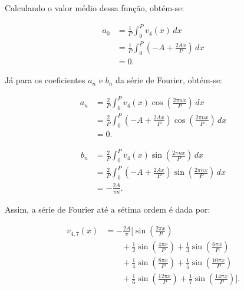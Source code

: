 Calculando o valor médio dessa função, obtém-se:

\begin{equation}
    \begin{aligned}
        a_0 &= \frac{1}{P} \int_{0}^{P} v_4(x)\,dx \\
            &= \frac{1}{P} \int_{0}^{P}
            \left(-A + \frac{2Ax}{P}\right)\,dx \\
            &= 0.
    \end{aligned}
\end{equation}

Já para os coeficientes $a_n$ e $b_n$ da série de Fourier, obtém-se:

\begin{equation}
    \begin{aligned}
        a_n &= \frac{2}{P} \int_{0}^{P} v_4(x)
            \cos\left(\frac{2\pi nx}{P}\right)\,dx \\
            &= \frac{2}{P} \int_{0}^{P}
            \left(-A + \frac{2Ax}{P}\right)
            \cos\left(\frac{2\pi nx}{P}\right)\,dx \\
            &= 0.
    \end{aligned}
\end{equation}

\begin{equation}
    \begin{aligned}
        b_n &= \frac{2}{P} \int_{0}^{P} v_4(x)
            \sin\left(\frac{2\pi nx}{P}\right)\,dx \\
            &= \frac{2}{P} \int_{0}^{P}
            \left(-A + \frac{2Ax}{P}\right)
            \sin\left(\frac{2\pi nx}{P}\right)\,dx \\
            &= -\frac{2A}{\pi n}.
    \end{aligned}
\end{equation}

Assim, a série de Fourier até a sétima ordem é dada por:

\begin{equation}
    \begin{aligned}
        v_{4,7}(x) &= -\frac{2A}{\pi}\biggl[
            \sin\left(\frac{2\pi x}{P}\right) \\
            &\qquad {}+ \frac{1}{2}\sin\left(\frac{4\pi x}{P}\right)
             + \frac{1}{3}\sin\left(\frac{6\pi x}{P}\right) \\
            &\qquad {}+ \frac{1}{4}\sin\left(\frac{8\pi x}{P}\right)
             + \frac{1}{5}\sin\left(\frac{10\pi x}{P}\right) \\
            &\qquad {}+ \frac{1}{6}\sin\left(\frac{12\pi x}{P}\right)
             + \frac{1}{7}\sin\left(\frac{14\pi x}{P}\right)\biggr].
    \end{aligned}
\end{equation}


